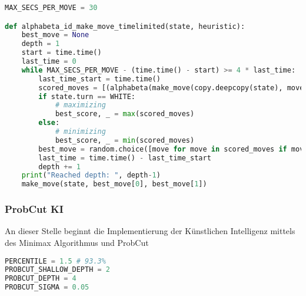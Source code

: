 \begin{lstlisting}[language=Python]
MAX_SECS_PER_MOVE = 30

def alphabeta_id_make_move_timelimited(state, heuristic):
    best_move = None
    depth = 1
    start = time.time()
    last_time = 0
    while MAX_SECS_PER_MOVE - (time.time() - start) >= 4 * last_time:
        last_time_start = time.time()
        scored_moves = [(alphabeta(make_move(copy.deepcopy(state), move[0], move[1]), depth-1, -math.inf, math.inf, heuristic), move) for move in state.possible_moves]
        if state.turn == WHITE:
            # maximizing
            best_score, _ = max(scored_moves)
        else:
            # minimizing
            best_score, _ = min(scored_moves)
        best_move = random.choice([move for move in scored_moves if move[0] == best_score])[1]
        last_time = time.time() - last_time_start
        depth += 1
    print("Reached depth: ", depth-1)
    make_move(state, best_move[0], best_move[1])
\end{lstlisting}

\hypertarget{probcut-ki}{%
\subsubsection{ProbCut KI}\label{probcut-ki}}

An dieser Stelle beginnt die Implementierung der Künstlichen Intelligenz
mittels des Minimax Algorithmus und ProbCut

\begin{lstlisting}[language=Python]
PERCENTILE = 1.5 # 93.3%
PROBCUT_SHALLOW_DEPTH = 2
PROBCUT_DEPTH = 4
PROBCUT_SIGMA = 0.05
\end{lstlisting}

